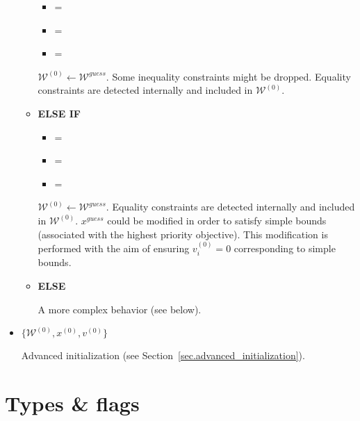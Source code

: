 \documentclass[12pt,a4paper]{article}
\begin{document}
\begin{itemize}
\begin{itemize}
    \begin{itemize}
    \item {} = 
    \item {} =  
    \item {\color{blue} = }
    \end{itemize}
    $\mathcal{W}^{(0)} \leftarrow \mathcal{W}^{\mathit{guess}}$. Some inequality constraints
    might be dropped. Equality constraints are detected internally and included in
    $\mathcal{W}^{(0)}$.

  \item[\ding{237}] {\bf ELSE IF}

    \begin{itemize}
    \item {\color{blue} = }
    \item {} =  
    \item {} = 
    \end{itemize}
    $\mathcal{W}^{(0)} \leftarrow \mathcal{W}^{\mathit{guess}}$. Equality constraints are detected
    internally and included in $\mathcal{W}^{(0)}$. $x^{\mathit{guess}}$ could be modified in order
    to satisfy simple bounds (associated with the highest priority objective). This modification is
    performed with the aim of ensuring $v_i^{(0)} = 0$ corresponding to simple bounds.

  \item[\ding{237}] {\bf ELSE}

    A more complex behavior (see below).

  \end{itemize}

\item {\color{blue}$\{\mathcal{W}^{(0)}, x^{(0)}, v^{(0)}\}$}

  Advanced initialization (see Section~\ref{sec.advanced_initialization}).

\end{itemize}

\clearpage

\section{Types \& flags}
\end{document}
